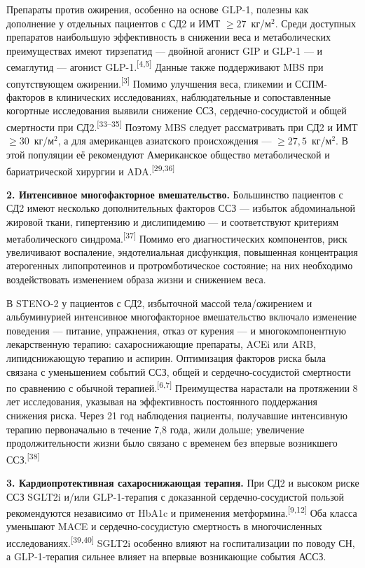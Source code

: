 \documentclass[11pt,a4paper]{article}
\newcommand{\src}[1]{\textsuperscript{[#1]}}
\begin{document}
Препараты против ожирения, особенно на основе GLP-1, полезны как дополнение у отдельных пациентов с СД2 и ИМТ $\geq27$~кг/м$^2$. Среди доступных препаратов наибольшую эффективность в снижении веса и метаболических преимуществах имеют тирзепатид --- двойной агонист GIP и GLP-1 --- и семаглутид --- агонист GLP-1.\src{4,5} Данные также поддерживают MBS при сопутствующем ожирении.\src{3} Помимо улучшения веса, гликемии и ССПМ-факторов в клинических исследованиях, наблюдательные и сопоставленные когортные исследования выявили снижение ССЗ, сердечно-сосудистой и общей смертности при СД2.\src{33--35} Поэтому MBS следует рассматривать при СД2 и ИМТ $\geq30$~кг/м$^2$, а для американцев азиатского происхождения --- $\geq27{,}5$~кг/м$^2$. В этой популяции её рекомендуют Американское общество метаболической и бариатрической хирургии и ADA.\src{29,36}

\textbf{2. Интенсивное многофакторное вмешательство.} Большинство пациентов с СД2 имеют несколько дополнительных факторов ССЗ --- избыток абдоминальной жировой ткани, гипертензию и дислипидемию --- и соответствуют критериям метаболического синдрома.\src{37} Помимо его диагностических компонентов, риск увеличивают воспаление, эндотелиальная дисфункция, повышенная концентрация атерогенных липопротеинов и протромботическое состояние; на них необходимо воздействовать изменением образа жизни и снижением веса.

В STENO-2 у пациентов с СД2, избыточной массой тела/ожирением и альбуминурией интенсивное многофакторное вмешательство включало изменение поведения --- питание, упражнения, отказ от курения --- и многокомпонентную лекарственную терапию: сахароснижающие препараты, ACEi или ARB, липидснижающую терапию и аспирин. Оптимизация факторов риска была связана с уменьшением событий ССЗ, общей и сердечно-сосудистой смертности по сравнению с обычной терапией.\src{6,7} Преимущества нарастали на протяжении 8 лет исследования, указывая на эффективность постоянного поддержания снижения риска. Через 21 год наблюдения пациенты, получавшие интенсивную терапию первоначально в течение 7,8 года, жили дольше; увеличение продолжительности жизни было связано с временем без впервые возникшего ССЗ.\src{38}

\textbf{3. Кардиопротективная сахароснижающая терапия.} При СД2 и высоком риске ССЗ SGLT2i и/или GLP-1-терапия с доказанной сердечно-сосудистой пользой рекомендуются независимо от HbA1c и применения метформина.\src{9,12} Оба класса уменьшают MACE и сердечно-сосудистую смертность в многочисленных исследованиях.\src{39,40} SGLT2i особенно влияют на госпитализации по поводу СН, а GLP-1-терапия сильнее влияет на впервые возникающие события АССЗ.
\end{document}
